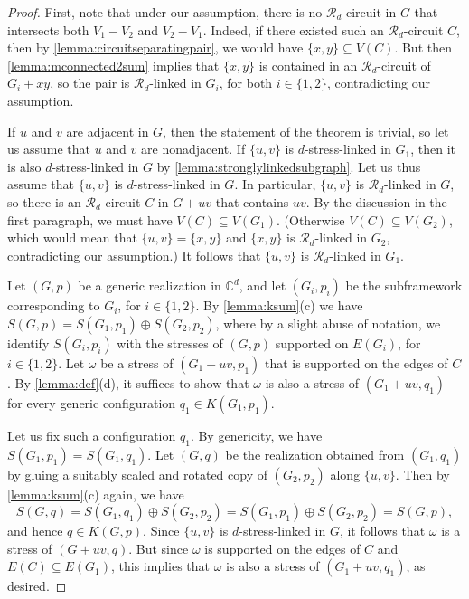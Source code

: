 \documentclass[11pt,a4paper,dvipsnames]{scrartcl}
\theoremstyle{definition}
\newcommand{\CC}{\mathbb{C}}
\newcommand{\strongly}[1]{${#1}$-stress-linked}
\newcommand{\sharedstresskernel}[1]{K}
\begin{document}
\begin{proof}
    First, note that under our assumption, there is no $\mathcal{R}_d$-circuit in $G$ that intersects both $V_1 - V_2$ and $V_2 - V_1$. Indeed, if there existed such an $\mathcal{R}_d$-circuit $C$, then by \cref{lemma:circuitseparatingpair}, we would have $\{x,y\} \subseteq V(C)$. But then \cref{lemma:mconnected2sum} implies that $\{x,y\}$ is contained in an $\mathcal{R}_d$-circuit of $G_i+xy$, so the pair is $\mathcal{R}_d$-linked in $G_i$, for both $i \in \{1,2\}$, contradicting our assumption. 
    
    If $u$ and $v$ are adjacent in $G$, then the statement of the theorem is trivial, so let us assume that $u$ and $v$ are nonadjacent. If $\{u,v\}$ is \strongly{d} in $G_1$, then it is also \strongly{d} in $G$ by \cref{lemma:stronglylinkedsubgraph}. Let us thus assume that $\{u,v\}$ is \strongly{d} in $G$. In particular, $\{u,v\}$ is $\mathcal{R}_d$-linked in $G$, so there is an $\mathcal{R}_d$-circuit $C$ in $G+uv$ that contains $uv$. By the discussion in the first paragraph, we must have $V(C) \subseteq V(G_1)$. (Otherwise $V(C) \subseteq V(G_2)$, which would mean that $\{u,v\} = \{x,y\}$ and $\{x,y\}$ is $\mathcal{R}_d$-linked in $G_2$, contradicting our assumption.) It follows that $\{u,v\}$ is $\mathcal{R}_d$-linked in $G_1$.
    
    Let $(G,p)$ be a generic realization in $\CC^d$, and let $(G_i,p_i)$ be the subframework corresponding to $G_i$, for $i\in \{1,2\}$. By \cref{lemma:ksum}(c) we have $S(G,p) = S(G_1,p_1) \oplus S(G_2,p_2)$, where by a slight abuse of notation, we identify $S(G_i,p_i)$ with the stresses of $(G,p)$ supported on $E(G_i)$, for $i \in \{1,2\}$. Let $\omega$ be a stress of $(G_1+uv,p_1)$ that is supported on the edges of $C$. By \cref{lemma:def}(d), it suffices to show that $\omega$ is also a stress of $(G_1+uv,q_1)$ for every generic configuration $q_1 \in \sharedstresskernel{d}(G_1,p_1)$.

    Let us fix such a configuration $q_1$. By genericity, we have $S(G_1,p_1) = S(G_1,q_1)$. Let $(G,q)$ be the realization obtained from $(G_1,q_1)$ by gluing a suitably scaled and rotated copy of $(G_2,p_2)$ along $\{u,v\}$. Then by \cref{lemma:ksum}(c) again, we have \[S(G,q) = S(G_1,q_1) \oplus S(G_2,p_2) = S(G_1,p_1) \oplus S(G_2,p_2) = S(G,p),\] and hence $q \in \sharedstresskernel{d}(G,p)$. Since $\{u,v\}$ is \strongly{d} in $G$, it follows that $\omega$ is a stress of $(G+uv,q)$. But since $\omega$ is supported on the edges of $C$ and $E(C) \subseteq E(G_1)$, this implies that $\omega$ is also a stress of $(G_1+uv,q_1)$, as desired.
\end{proof}
\end{document}
